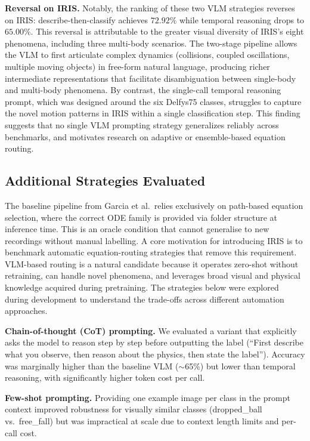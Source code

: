 \documentclass[runningheads]{llncs}
\begin{document}
\textbf{Reversal on IRIS.} Notably, the ranking of these two VLM strategies reverses on IRIS: describe-then-classify achieves $72.92\%$ while temporal reasoning drops to $65.00\%$. This reversal is attributable to the greater visual diversity of IRIS's eight phenomena, including three multi-body scenarios. The two-stage pipeline allows the VLM to first articulate complex dynamics (collisions, coupled oscillations, multiple moving objects) in free-form natural language, producing richer intermediate representations that facilitate disambiguation between single-body and multi-body phenomena. By contrast, the single-call temporal reasoning prompt, which was designed around the six Delfys75 classes, struggles to capture the novel motion patterns in IRIS within a single classification step. This finding suggests that no single VLM prompting strategy generalizes reliably across benchmarks, and motivates research on adaptive or ensemble-based equation routing.

\subsection{Additional Strategies Evaluated}
\label{app:vlm_alternatives}

The baseline pipeline from Garcia et al.\ relies exclusively on path-based
equation selection, where the correct ODE family is provided via folder
structure at inference time.  This is an oracle condition that cannot
generalise to new recordings without manual labelling.  A core motivation
for introducing IRIS is to benchmark automatic equation-routing strategies
that remove this requirement.  VLM-based routing is a natural candidate
because it operates zero-shot without retraining, can handle novel phenomena,
and leverages broad visual and physical knowledge acquired during pretraining.
The strategies below were explored during development to understand the
trade-offs across different automation approaches.

\textbf{Chain-of-thought (CoT) prompting.} We evaluated a variant that
explicitly asks the model to reason step by step before outputting the label
(``First describe what you observe, then reason about the physics, then
state the label'').  Accuracy was marginally higher than the baseline
VLM ($\sim$65\%) but lower than temporal reasoning, with significantly
higher token cost per call.

\textbf{Few-shot prompting.} Providing one example image per class in the
prompt context improved robustness for visually similar classes
(dropped\_ball vs.\ free\_fall) but was impractical at scale due to context
length limits and per-call cost.
\end{document}
